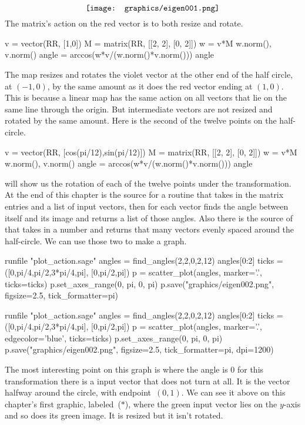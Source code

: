 \begin{equation*}
  \vcenteredhbox{\texttt{[image: graphics/eigen001.png]}}
\end{equation*}
The matrix's action on the red vector is to both resize and rotate.
\begin{sageoutput}
v = vector(RR, [1,0])
M = matrix(RR, [[2, 2], [0, 2]])
w = v*M
w.norm(), v.norm() 
angle = arccos(w*v/(w.norm()*v.norm())) 
angle 
\end{sageoutput}
\noindent The map resizes and rotates the violet vector at the other end of the 
half circle, at $(-1,0)$, by the
same amount as it does the red vector ending at $(1,0)$. 
This is because a linear map has the same action on 
all vectors that lie on the same line through the origin.
But intermediate vectors are not resized and rotated by the same
amount.
Here is the second of the twelve points on the half-circle.
\begin{sageoutput}
v = vector(RR, [cos(pi/12),sin(pi/12)])
M = matrix(RR, [[2, 2], [0, 2]])
w = v*M
w.norm(), v.norm() 
angle = arccos(w*v/(w.norm()*v.norm())) 
angle 
\end{sageoutput}

\Sage{} will show us the rotation of each of the twelve points 
under the transformation.
At the end of this chapter is the source for a routine 
that takes in the matrix entries and a list of input vectors, then
for each vector finds the angle between itself and its image and
returns a list of those angles.
Also there is the source of  that takes in a
number and returns that many vectors evenly spaced around the half-circle. 
We can use those two to make a graph.
\begin{sageoutput}[d,0,1]
runfile "plot_action.sage"  
angles = find_angles(2,2,0,2,12)
angles[0:2]
ticks = ([0,pi/4,pi/2,3*pi/4,pi], [0,pi/2,pi])
p = scatter_plot(angles, marker='.', ticks=ticks)
p.set_axes_range(0, pi, 0, pi) 
p.save("graphics/eigen002.png", figsize=2.5, tick_formatter=pi)
\end{sageoutput}
\begin{sagesilent}
runfile "plot_action.sage"  
angles = find_angles(2,2,0,2,12)
angles[0:2]
ticks = ([0,pi/4,pi/2,3*pi/4,pi], [0,pi/2,pi])
p = scatter_plot(angles, marker='.', edgecolor='blue', ticks=ticks)
p.set_axes_range(0, pi, 0, pi) 
p.save("graphics/eigen002.png", figsize=2.5, tick_formatter=pi, dpi=1200)
\end{sagesilent}
\begin{center}
\end{center}
The most interesting point on this graph is where the angle is $0$\Dash
for this transformation there is a input vector that does not turn at all.
It is the vector halfway around the circle, with endpoint~$(0,1)$. 
We can see it above on this chapter's first graphic, labeled~($*$), 
where the green input vector lies on the $y$-axis and so does its green image.
It is resized but it isn't rotated.




